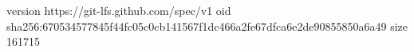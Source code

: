 version https://git-lfs.github.com/spec/v1
oid sha256:670534577845f44fc05c0cb141567f1dc466a2fe67dfca6e2de90855850a6a49
size 161715
